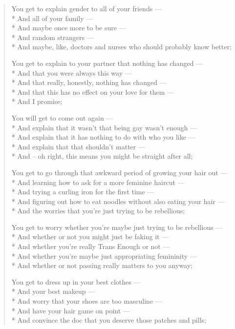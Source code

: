 \begin{verse}
  You get to explain gender to all of your friends ---\\*
  \vin And all of your family ---\\*
  \vin And maybe once more to be sure ---\\*
  \vin And random strangers ---\\*
  \vin And maybe, like, doctors and nurses who should probably know better;

  You get to explain to your partner that nothing has changed ---\\*
  \vin And that you were always this way ---\\*
  \vin And that really, honestly, nothing has changed ---\\*
  \vin And that this has no effect on your love for them ---\\*
  \vin And I promise;

  You will get to come out again ---\\*
  \vin And explain that it wasn't that being gay wasn't enough ---\\*
  \vin And explain that it has nothing to do with who you like ---\\*
  \vin And explain that that shouldn't matter ---\\*
  \vin And -- oh right, this means you might be straight after all;

  You get to go through that awkward period of growing your hair out ---\\*
  \vin And learning how to ask for a more feminine haircut ---\\*
  \vin And trying a curling iron for the first time ---\\*
  \vin And figuring out how to eat noodles without also eating your hair ---\\*
  \vin And the worries that you're just trying to be rebellious;

  You get to worry whether you're maybe just trying to be rebellious ---\\*
  \vin And whether or not you might just be faking it ---\\*
  \vin And whether you're really Trans Enough or not ---\\*
  \vin And whether you're maybe just appropriating femininity ---\\*
  \vin And whether or not passing really matters to you anyway;

  You get to dress up in your best clothes ---\\*
  \vin And your best makeup ---\\*
  \vin And worry that your shoes are too masculine ---\\*
  \vin And have your hair game on point ---\\*
  \vin And convince the doc that you deserve those patches and pills;


\end{verse}
